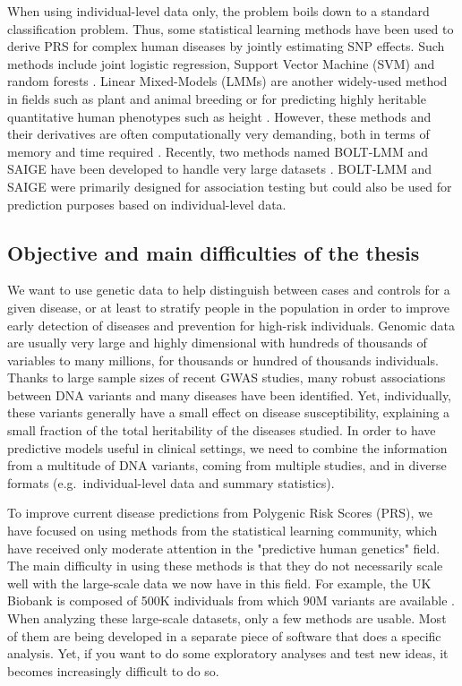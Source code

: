 When using individual-level data only, the problem boils down to a standard classification problem. Thus, some statistical learning methods have been used to derive PRS for complex human diseases by jointly estimating SNP effects. Such methods include joint logistic regression, Support Vector Machine (SVM) and random forests \cite[]{wei2009disease,abraham2012sparsnp,abraham2014accurate,botta2014exploiting,okser2014regularized}.
Linear Mixed-Models (LMMs) are another widely-used method in fields such as plant and animal breeding or for predicting highly heritable quantitative human phenotypes such as height \cite[]{yang2010common}. 
However, these methods and their derivatives are often computationally very demanding, both in terms of memory and time required \cite[]{zhou2013polygenic,golan2014effective,speed2014multiblup,maier2015joint}.
Recently, two methods named BOLT-LMM and SAIGE have been developed to handle very large datasets \cite[]{loh2018mixed,zhou2018efficiently}. BOLT-LMM and SAIGE were primarily designed for association testing but could also be used for prediction purposes based on individual-level data.

\subsection{Objective and main difficulties of the thesis}

We want to use genetic data to help distinguish between cases and controls for a given disease, or at least to stratify people in the population in order to improve early detection of diseases and prevention for high-risk individuals.
Genomic data are usually very large and highly dimensional with hundreds of thousands of variables to many millions, for thousands or hundred of thousands individuals.
Thanks to large sample sizes of recent GWAS studies, many robust associations between DNA variants and many diseases have been identified. Yet, individually, these variants generally have a small effect on disease susceptibility, explaining a small fraction of the total heritability of the diseases studied. 
In order to have predictive models useful in clinical settings, we need to combine the information from a multitude of DNA variants, coming from multiple studies, and in diverse formats (e.g.\ individual-level data and summary statistics).

To improve current disease predictions from Polygenic Risk Scores (PRS), we have focused on using methods from the statistical learning community, which have received only moderate attention in the "predictive human genetics" field.
The main difficulty in using these methods is that they do not necessarily scale well with the large-scale data we now have in this field.
For example, the UK Biobank is composed of 500K individuals from which 90M variants are available \cite{bycroft2017genome}.
When analyzing these large-scale datasets, only a few methods are usable.
Most of them are being developed in a separate piece of software that does a specific analysis.
Yet, if you want to do some exploratory analyses and test new ideas, it becomes increasingly difficult to do so.

